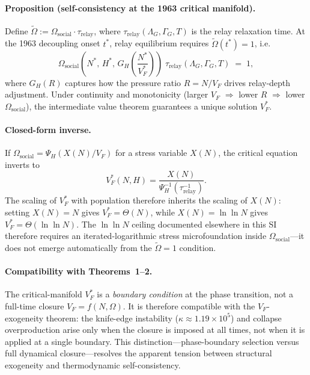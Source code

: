 \documentclass[11pt]{article}
\begin{document}
\paragraph{Proposition (self-consistency at the 1963 critical manifold).}
Define $\tilde\Omega := \Omega_{\mathrm{social}} \cdot \tau_{\mathrm{relay}}$,
where $\tau_{\mathrm{relay}}(\Lambda_G,\Gamma_G,T)$ is the relay relaxation
time. At the 1963 decoupling onset $t^*$, relay equilibrium requires
$\tilde\Omega(t^*) = 1$, i.e.\
\[
\Omega_{\mathrm{social}}\!\left(N^*,\,H^*,\,
G_H\!\!\left(\frac{N^*}{V_F^*}\right)\right)
\;\tau_{\mathrm{relay}}(\Lambda_G,\Gamma_G,T) \;=\; 1,
\]
where $G_H(R)$ captures how the pressure ratio $R = N/V_F$ drives relay-depth
adjustment. Under continuity and monotonicity (larger $V_F$ $\Rightarrow$
lower $R$ $\Rightarrow$ lower $\Omega_{\mathrm{social}}$), the intermediate
value theorem guarantees a unique solution $V_F^*$.

\paragraph{Closed-form inverse.}
If $\Omega_{\mathrm{social}} = \Psi_H(X(N)/V_F)$ for a stress variable $X(N)$,
the critical equation inverts to
\[
V_F^*(N,H) = \frac{X(N)}{\Psi_H^{-1}(\tau_{\mathrm{relay}}^{-1})}.
\]
The scaling of $V_F^*$ with population therefore inherits the scaling of $X(N)$:
setting $X(N)=N$ gives $V_F^*=\Theta(N)$, while $X(N)=\ln\ln N$ gives
$V_F^*=\Theta(\ln\ln N)$. The $\ln\ln N$ ceiling documented elsewhere in this
SI therefore requires an iterated-logarithmic stress microfoundation inside
$\Omega_{\mathrm{social}}$---it does not emerge automatically from the
$\tilde\Omega=1$ condition.

\paragraph{Compatibility with Theorems~1--2.}
The critical-manifold $V_F^*$ is a \emph{boundary condition} at the phase
transition, not a full-time closure $V_F = f(N,\Omega)$. It is therefore
compatible with the $V_F$-exogeneity theorem: the knife-edge instability
($\kappa \approx 1.19\times 10^5$) and collapse overproduction arise only when
the closure is imposed at all times, not when it is applied at a single
boundary. This distinction---phase-boundary selection versus full dynamical
closure---resolves the apparent tension between structural exogeneity and
thermodynamic self-consistency.
\end{document}
